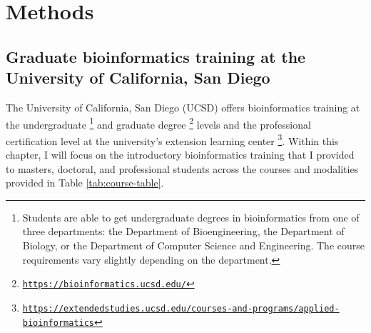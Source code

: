 \section{Methods}

\subsection{Graduate bioinformatics training at the University of California, San Diego}

The University of California, San Diego (UCSD) offers bioinformatics training at the undergraduate \footnote{Students are able to get undergraduate degrees in bioinformatics from one of three departments: the Department of Bioengineering, the Department of Biology, or the Department of Computer Science and Engineering. The course requirements vary slightly depending on the department.} and graduate degree \footnote{\href{https://bioinformatics.ucsd.edu/}{\texttt{https://bioinformatics.ucsd.edu/}}} levels and the professional certification level at the university's extension learning center \footnote{\href{https://extendedstudies.ucsd.edu/courses-and-programs/applied-bioinformatics}{\texttt{https://extendedstudies.ucsd.edu/courses-and-programs/applied-bioinformatics}}}. Within this chapter, I will focus on the introductory bioinformatics training that I provided to masters, doctoral, and professional students across the courses and modalities provided in Table \ref{tab:course-table}. 

